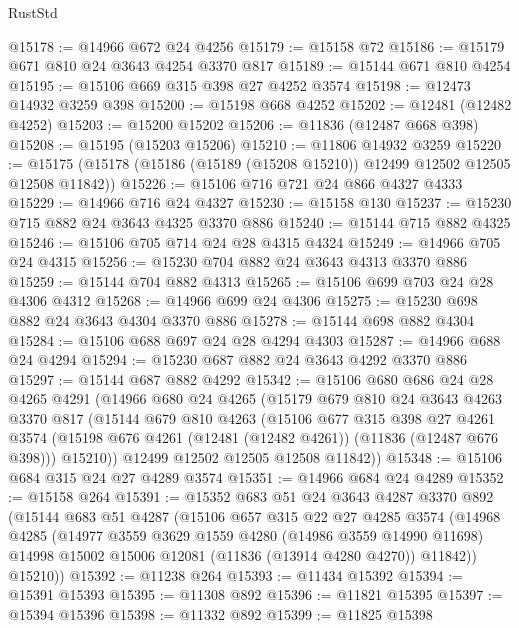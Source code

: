 \begin{lexlean}{RustStd}
\begin{coremodule}
@15178 := @14966 @672 @24 @4256
@15179 := @15158 @72
@15186 := @15179 @671 @810 @24 @3643 @4254 @3370 @817
@15189 := @15144 @671 @810 @4254
@15195 := @15106 @669 @315 @398 @27 @4252 @3574
@15198 := @12473 @14932 @3259 @398
@15200 := @15198 @668 @4252
@15202 := @12481 (@12482 @4252)
@15203 := @15200 @15202
@15206 := @11836 (@12487 @668 @398)
@15208 := @15195 (@15203 @15206)
@15210 := @11806 @14932 @3259
@15220 := @15175 (@15178 (@15186 (@15189 (@15208 @15210)) @12499 @12502 @12505 @12508 @11842))
@15226 := @15106 @716 @721 @24 @866 @4327 @4333
@15229 := @14966 @716 @24 @4327
@15230 := @15158 @130
@15237 := @15230 @715 @882 @24 @3643 @4325 @3370 @886
@15240 := @15144 @715 @882 @4325
@15246 := @15106 @705 @714 @24 @28 @4315 @4324
@15249 := @14966 @705 @24 @4315
@15256 := @15230 @704 @882 @24 @3643 @4313 @3370 @886
@15259 := @15144 @704 @882 @4313
@15265 := @15106 @699 @703 @24 @28 @4306 @4312
@15268 := @14966 @699 @24 @4306
@15275 := @15230 @698 @882 @24 @3643 @4304 @3370 @886
@15278 := @15144 @698 @882 @4304
@15284 := @15106 @688 @697 @24 @28 @4294 @4303
@15287 := @14966 @688 @24 @4294
@15294 := @15230 @687 @882 @24 @3643 @4292 @3370 @886
@15297 := @15144 @687 @882 @4292
@15342 := @15106
    @680
    @686
    @24
    @28
    @4265
    @4291
    (@14966
      @680
      @24
      @4265
      (@15179
        @679
        @810
        @24
        @3643
        @4263
        @3370
        @817
        (@15144
          @679
          @810
          @4263
          (@15106
            @677
            @315
            @398
            @27
            @4261
            @3574
            (@15198 @676 @4261 (@12481 (@12482 @4261)) (@11836 (@12487 @676 @398)))
            @15210))
        @12499
        @12502
        @12505
        @12508
        @11842))
@15348 := @15106 @684 @315 @24 @27 @4289 @3574
@15351 := @14966 @684 @24 @4289
@15352 := @15158 @264
@15391 := @15352
    @683
    @51
    @24
    @3643
    @4287
    @3370
    @892
    (@15144
      @683
      @51
      @4287
      (@15106
        @657
        @315
        @22
        @27
        @4285
        @3574
        (@14968
          @4285
          (@14977
            @3559
            @3629
            @1559
            @4280
            (@14986 @3559 @14990 @11698)
            @14998
            @15002
            @15006
            @12081
            (@11836 (@13914 @4280 @4270))
            @11842))
        @15210))
@15392 := @11238 @264
@15393 := @11434 @15392
@15394 := @15391 @15393
@15395 := @11308 @892
@15396 := @11821 @15395
@15397 := @15394 @15396
@15398 := @11332 @892
@15399 := @11825 @15398

\end{coremodule}
\end{lexlean}
